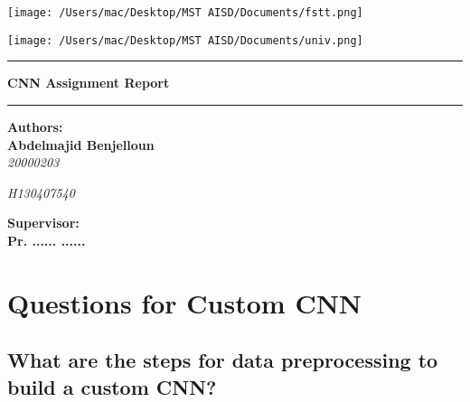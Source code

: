 \documentclass{article}
\begin{document}
\vspace{4cm} 

\begin{center}
    \begin{minipage}{0.45\textwidth}
        \centering
        \texttt{[image: /Users/mac/Desktop/MST AISD/Documents/fstt.png]}
    \end{minipage}
    \hspace{0.05\textwidth}
    \begin{minipage}{0.45\textwidth}
        \centering
        \texttt{[image: /Users/mac/Desktop/MST AISD/Documents/univ.png]}
    \end{minipage}
\end{center}
\vspace{5cm}
\noindent\rule{\linewidth}{1.5pt}
\begin{center}
    \textbf{\LARGE CNN Assignment Report   }
\end{center}
\noindent\rule{\linewidth}{1.5pt}
\vspace{2cm}
\begin{center}
\textbf{Authors:} \hspace{1cm} \\
\vspace{0.5cm}
\textbf{Abdelmajid Benjelloun} \\
\vspace{0.2cm}
\textit{20000203}\\
\vspace{0.2cm}

\textit{H130407540}\\
\vspace{0.2cm}


\textbf{Supervisor:} \\
\vspace{0.5cm}
\textbf{Pr. ...... ......}\\
\date{October 2024}
\end{center}

\newpage
\tableofcontents

\newpage

\section{Questions for Custom CNN}
\subsection{What are the steps for data preprocessing to build a custom CNN?}
\end{document}
